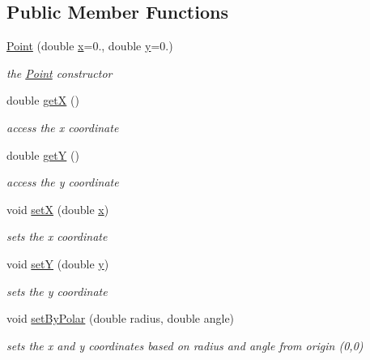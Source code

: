 \subsection*{Public Member Functions}
\begin{DoxyCompactItemize}
\item 
\mbox{\hyperlink{class_jinks_draw_1_1_point_a052cf69d98628f9ee7fd6649c401c409}{Point}} (double \mbox{\hyperlink{class_jinks_draw_1_1_point_a49a46c3d78c0c68260d55dacdee458de}{x}}=0., double \mbox{\hyperlink{class_jinks_draw_1_1_point_ad2dbfbd07baf41cfe82737a4f347bab5}{y}}=0.)
\begin{DoxyCompactList}\small\item\em the \mbox{\hyperlink{class_jinks_draw_1_1_point}{Point}} constructor \end{DoxyCompactList}\item 
double \mbox{\hyperlink{class_jinks_draw_1_1_point_ab7f568b7614e93baeb6a2b80ae6d4eda}{getX}} ()
\begin{DoxyCompactList}\small\item\em access the x coordinate \end{DoxyCompactList}\item 
double \mbox{\hyperlink{class_jinks_draw_1_1_point_a3dcffb5d490aa4c17a6d468b944fc590}{getY}} ()
\begin{DoxyCompactList}\small\item\em access the y coordinate \end{DoxyCompactList}\item 
void \mbox{\hyperlink{class_jinks_draw_1_1_point_a88c728619ffd56b0a05e73aa12a749e1}{setX}} (double \mbox{\hyperlink{class_jinks_draw_1_1_point_a49a46c3d78c0c68260d55dacdee458de}{x}})
\begin{DoxyCompactList}\small\item\em sets the x coordinate \end{DoxyCompactList}\item 
void \mbox{\hyperlink{class_jinks_draw_1_1_point_a828cbcb4a21065420758e422265dc35f}{setY}} (double \mbox{\hyperlink{class_jinks_draw_1_1_point_ad2dbfbd07baf41cfe82737a4f347bab5}{y}})
\begin{DoxyCompactList}\small\item\em sets the y coordinate \end{DoxyCompactList}\item 
void \mbox{\hyperlink{class_jinks_draw_1_1_point_a8dad65ea830fc616d2c1fdddf2809cb0}{set\+By\+Polar}} (double radius, double angle)
\begin{DoxyCompactList}\small\item\em sets the x and y coordinates based on radius and angle from origin (0,0) \end{DoxyCompactList}\end{DoxyCompactItemize}
